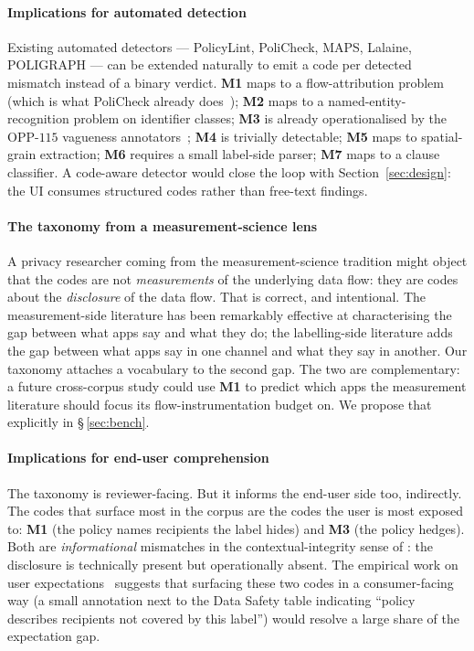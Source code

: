 \documentclass[11pt,a4paper]{article}
\newcommand{\code}[1]{\textsf{\textbf{#1}}}
\begin{document}
\paragraph{Implications for automated detection}
Existing automated detectors --- PolicyLint, PoliCheck, MAPS, Lalaine,
POLIGRAPH --- can be extended naturally to emit a code per detected
mismatch instead of a binary verdict. \code{M1} maps to a
flow-attribution problem (which is what PoliCheck already
does~\citep{andow2020policheck}); \code{M2} maps to a
named-entity-recognition problem on identifier classes; \code{M3} is
already operationalised by the OPP-$115$ vagueness
annotators~\citep{wilson2016creation,bhatia2016theory}; \code{M4} is
trivially detectable; \code{M5} maps to spatial-grain extraction;
\code{M6} requires a small label-side parser; \code{M7} maps to a
clause classifier. A code-aware detector would close the loop with
Section~\ref{sec:design}: the UI consumes structured codes rather
than free-text findings.

\paragraph{The taxonomy from a measurement-science lens}
A privacy researcher coming from the measurement-science tradition
\citep{englehardt2016online,razaghpanah2018apps,reardon2019fifty,reyes2018wont,ren2018bug}
might object that the codes are not \emph{measurements} of the
underlying data flow: they are codes about the \emph{disclosure} of
the data flow. That is correct, and intentional. The measurement-side
literature has been remarkably effective at characterising the
gap between what apps say and what they do; the labelling-side
literature
\citep{xiao2023lalaine,khandelwal2023comparing,khandelwal2024unpacking,li2022understanding}
adds the gap between what apps say in one channel and what they say in
another. Our taxonomy attaches a vocabulary to the second gap. The
two are complementary: a future cross-corpus study could use \code{M1}
to predict which apps the measurement literature should focus its
flow-instrumentation budget on. We propose that explicitly in
\S\,\ref{sec:bench}.

\paragraph{Implications for end-user comprehension}
The taxonomy is reviewer-facing. But it informs the end-user side too,
indirectly. The codes that surface most in the corpus are the codes
the user is most exposed to: \code{M1} (the policy names recipients
the label hides) and \code{M3} (the policy hedges). Both are
\emph{informational} mismatches in the contextual-integrity sense of
\citet{nissenbaum2004privacy}: the disclosure is technically present
but operationally absent. The empirical work on user
expectations~\citep{rao2016expecting} suggests that surfacing these
two codes in a consumer-facing way (a small annotation next to the
Data Safety table indicating ``policy describes recipients not
covered by this label'') would resolve a large share of the
expectation gap.
\end{document}
